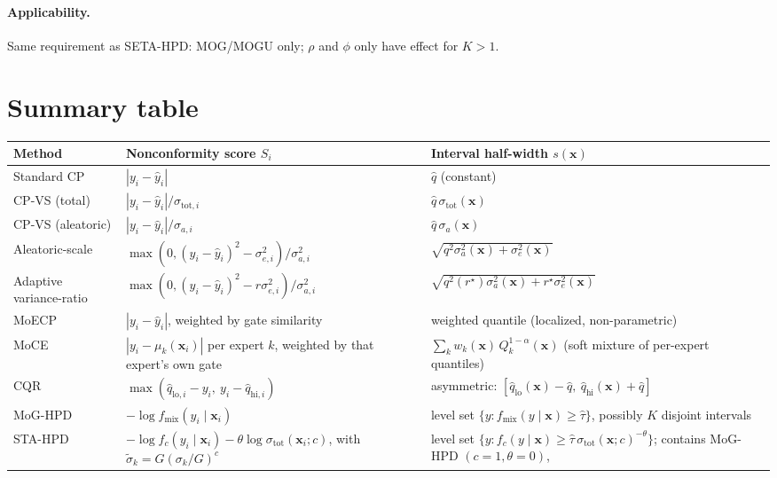 \documentclass[11pt]{article}
\begin{document}
\paragraph{Applicability.} Same requirement as SETA-HPD: MOG/MOGU only; $\rho$ and $\phi$ only
have effect for $K>1$.

\section{Summary table}

\begin{center}
\begin{tabular}{@{}p{4.1cm}p{5.3cm}p{5.3cm}@{}}
\toprule
\textbf{Method} & \textbf{Nonconformity score $S_i$} & \textbf{Interval half-width $s(\bm{x})$} \\
\midrule
Standard CP & $|y_i - \hat{y}_i|$ & $\hat{q}$ (constant) \\
CP-VS (total) & $|y_i-\hat{y}_i|/\sigma_{\mathrm{tot},i}$ &
$\hat{q}\,\sigma_{\mathrm{tot}}(\bm{x})$ \\
CP-VS (aleatoric) & $|y_i-\hat{y}_i|/\sigma_{a,i}$ & $\hat{q}\,\sigma_a(\bm{x})$ \\
Aleatoric-scale & $\max(0, (y_i-\hat{y}_i)^2 - \sigma_{e,i}^2)/\sigma_{a,i}^2$ &
$\sqrt{q^2\sigma_a^2(\bm{x}) + \sigma_e^2(\bm{x})}$ \\
Adaptive variance-ratio & $\max(0, (y_i-\hat{y}_i)^2 - r\sigma_{e,i}^2)/\sigma_{a,i}^2$ &
$\sqrt{q^2(r^\star)\sigma_a^2(\bm{x}) + r^\star\sigma_e^2(\bm{x})}$ \\
MoECP & $|y_i - \hat{y}_i|$, weighted by gate similarity & weighted quantile (localized,
non-parametric) \\
MoCE & $|y_i - \mu_k(\bm{x}_i)|$ per expert $k$, weighted by that expert's own gate & $\sum_k
w_k(\bm{x})\,Q_k^{1-\alpha}(\bm{x})$ (soft mixture of per-expert quantiles) \\
CQR & $\max(\hat{q}_{\mathrm{lo},i}-y_i,\ y_i-\hat{q}_{\mathrm{hi},i})$ & asymmetric:
$[\hat{q}_{\mathrm{lo}}(\bm{x})-\hat q,\ \hat{q}_{\mathrm{hi}}(\bm{x})+\hat q]$ \\
MoG-HPD & $-\log f_{\mathrm{mix}}(y_i \mid \bm{x}_i)$ & level set $\{y:
f_{\mathrm{mix}}(y\mid\bm{x}) \ge \hat\tau\}$, possibly $K$ disjoint intervals \\
STA-HPD & $-\log f_c(y_i\mid\bm{x}_i) - \theta\log\sigma_{\mathrm{tot}}(\bm{x}_i;c)$, with
$\tilde\sigma_k = G(\sigma_k/G)^c$ & level set $\{y: f_c(y\mid\bm{x}) \ge
\hat\tau\,\sigma_{\mathrm{tot}}(\bm{x};c)^{-\theta}\}$; contains MoG-HPD $(c{=}1,\theta{=}0)$,

\end{tabular}
\end{center}
\end{document}
